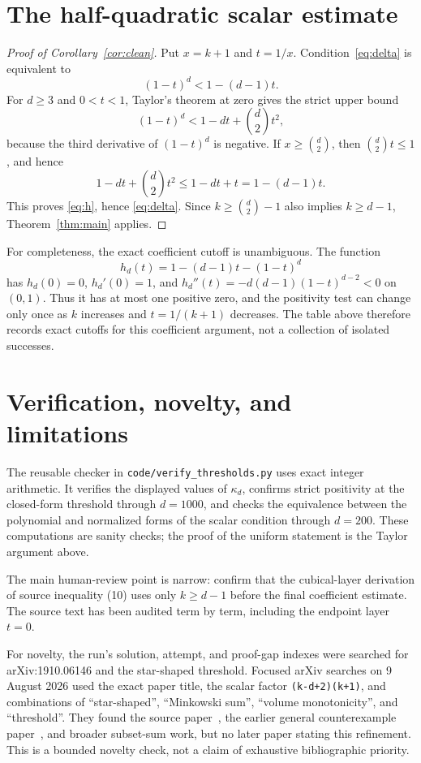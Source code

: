 \documentclass[11pt]{article}
\begin{document}
\section{The half-quadratic scalar estimate}

\begin{proof}[Proof of Corollary~\ref{cor:clean}]
Put $x=k+1$ and $t=1/x$.  Condition~\eqref{eq:delta} is equivalent to
\begin{equation}\label{eq:h}
                  (1-t)^d<1-(d-1)t.
\end{equation}
For $d\ge3$ and $0<t<1$, Taylor's theorem at zero gives the strict upper
bound
\[
                 (1-t)^d<1-dt+\binom d2t^2,
\]
because the third derivative of $(1-t)^d$ is negative.  If
$x\ge\binom d2$, then $\binom d2t\le1$, and hence
\[
 1-dt+\binom d2t^2\le1-dt+t=1-(d-1)t.
\]
This proves \eqref{eq:h}, hence \eqref{eq:delta}.  Since
$k\ge\binom d2-1$ also implies $k\ge d-1$, Theorem~\ref{thm:main} applies.
\end{proof}

For completeness, the exact coefficient cutoff is unambiguous.  The function
\[
                h_d(t)=1-(d-1)t-(1-t)^d
\]
has $h_d(0)=0$, $h_d'(0)=1$, and
$h_d''(t)=-d(d-1)(1-t)^{d-2}<0$ on $(0,1)$.  Thus it has at most one
positive zero, and the positivity test can change only once as $k$ increases
and $t=1/(k+1)$ decreases.  The table above therefore records exact cutoffs
for this coefficient argument, not a collection of isolated successes.

\section{Verification, novelty, and limitations}

The reusable checker in \texttt{code/verify\_thresholds.py} uses exact integer
arithmetic.  It verifies the displayed values of $\kappa_d$, confirms strict
positivity at the closed-form threshold through $d=1000$, and checks the
equivalence between the polynomial and normalized forms of the scalar
condition through $d=200$.  These computations are sanity checks; the proof
of the uniform statement is the Taylor argument above.

The main human-review point is narrow: confirm that the cubical-layer
derivation of source inequality (10) uses only $k\ge d-1$ before the final
coefficient estimate.  The source text has been audited term by term, including
the endpoint layer $t=0$.

For novelty, the run's solution, attempt, and proof-gap indexes were searched
for arXiv:1910.06146 and the star-shaped threshold.  Focused arXiv searches on
9 August 2026 used the exact paper title, the scalar factor
\texttt{(k-d+2)(k+1)}, and combinations of ``star-shaped'', ``Minkowski
sum'', ``volume monotonicity'', and ``threshold''.  They found the source
paper~\cite{FLZ}, the earlier general counterexample paper~\cite{FMMZ}, and
broader subset-sum work, but no later paper stating this refinement.  This is
a bounded novelty check, not a claim of exhaustive bibliographic priority.
\end{document}
